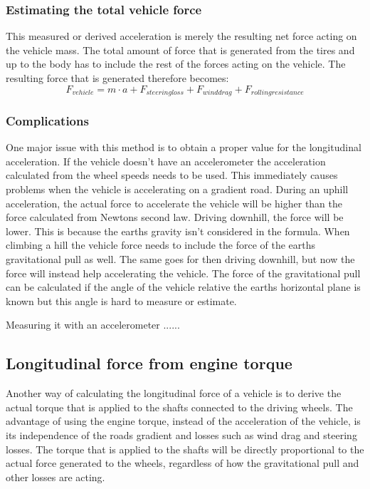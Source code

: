 \subsubsection{Estimating the total vehicle force}
This measured or derived acceleration is merely the resulting net force acting on the vehicle mass. The total amount of force that is generated from the tires and up to the body has to include the rest of the forces acting on the vehicle. The resulting force that is generated therefore becomes: 
\begin{equation}
F_{vehicle} = m \cdot a + F_{steering loss} + F_{wind drag} + F_{rolling resistance}
\end{equation}

\subsubsection{Complications}
One major issue with this method is to obtain a proper value for the longitudinal acceleration. If the vehicle doesn't have an accelerometer the acceleration calculated from the wheel speeds needs to be used. This immediately causes problems when the vehicle is accelerating on a gradient road. During an uphill acceleration, the actual force to accelerate the vehicle will be higher than the force calculated from Newtons second law. Driving downhill, the force will be lower. This is because the earths gravity isn't considered in the formula. When climbing a hill the vehicle force needs to include the force of the earths gravitational pull as well. The same goes for then driving downhill, but now the force will instead help accelerating the vehicle. The force of the gravitational pull can be calculated if the angle of the vehicle relative the earths horizontal plane is known but this angle is hard to measure or estimate. 

Measuring it with an accelerometer ......




\subsection{Longitudinal force from engine torque}

Another way of calculating the longitudinal force of a vehicle is to derive the actual torque that is applied to the shafts connected to the driving wheels. The advantage of using the engine torque, instead of the acceleration of the vehicle, is its independence of the roads gradient and losses such as wind drag and steering losses. The torque that is applied to the shafts will be directly proportional to the actual force generated to the wheels, regardless of how the gravitational pull and other losses are acting. 

